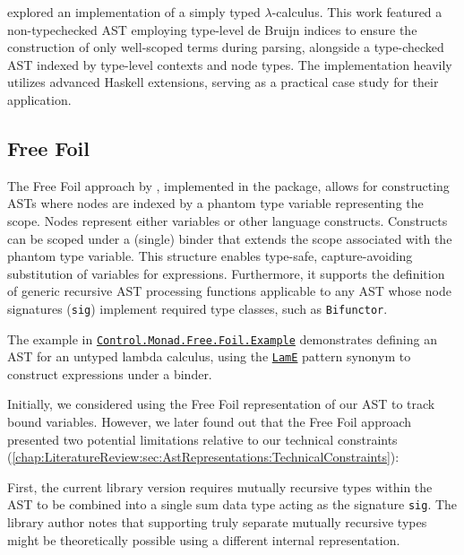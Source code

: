 \citeauthor{eisenberg-stitch-2020} \cite{eisenberg-stitch-2020} explored an implementation of a simply typed $\lambda$-calculus. This work featured a non-typechecked AST employing type-level de Bruijn indices to ensure the construction of only well-scoped terms during parsing, alongside a type-checked AST indexed by type-level contexts and node types. The implementation heavily utilizes advanced Haskell extensions, serving as a practical case study for their application.

\subsection{Free Foil}
\label{chap:LiteratureReview:sec:AstRepresentations:FreeFoil}

The Free Foil approach \cite{kudasov-free-2024} by \citeauthor{kudasov-free-2024}, implemented in the \cite{free-foil-hackage} package, allows for constructing ASTs where nodes are indexed by a phantom type variable representing the scope. Nodes represent either variables or other language constructs. Constructs can be scoped under a (single) binder that extends the scope associated with the phantom type variable. This structure enables type-safe, capture-avoiding substitution of variables for expressions. Furthermore, it supports the definition of generic recursive AST processing functions applicable to any AST whose node signatures (\texttt{sig}) implement required type classes, such as \texttt{Bifunctor}.

The example in \href{https://hackage.haskell.org/package/free-foil-0.2.0/docs/Control-Monad-Free-Foil-Example.html}{\texttt{Control.Monad.Free.Foil.Example}} demonstrates defining an AST for an untyped lambda calculus, using the \href{https://hackage.haskell.org/package/free-foil-0.2.0/docs/src/Control.Monad.Free.Foil.Example.html#LamE}{\texttt{LamE}} pattern synonym to construct expressions under a binder.

Initially, we considered using the Free Foil representation of our AST to track bound variables. However, we later found out that the Free Foil approach presented two potential limitations relative to our technical constraints (\cref{chap:LiteratureReview:sec:AstRepresentations:TechnicalConstraints}):

First, the current library version requires mutually recursive types within the AST to be combined into a single sum data type acting as the signature \texttt{sig}. The library author notes that supporting truly separate mutually recursive types might be theoretically possible using a different internal representation.

